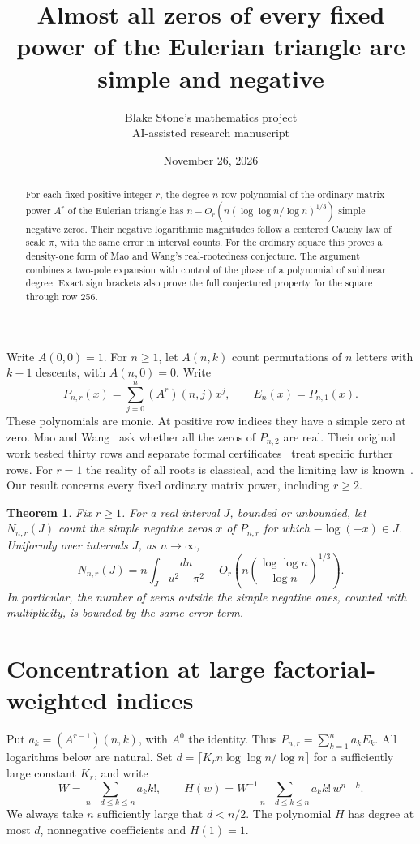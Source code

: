 \documentclass[11pt]{article}
\title{Almost all zeros of every fixed power of the Eulerian triangle are simple and negative}
\author{Blake Stone's mathematics project\\\small AI-assisted research manuscript}
\date{November 26, 2026}
\newtheorem{theorem}{Theorem}
\begin{document}
\maketitle
\begin{abstract}
For each fixed positive integer $r$, the degree-$n$ row polynomial of the ordinary matrix power $A^r$ of the Eulerian triangle has $n-O_r(n(\log\log n/\log n)^{1/3})$ simple negative zeros. Their negative logarithmic magnitudes follow a centered Cauchy law of scale $\pi$, with the same error in interval counts. For the ordinary square this proves a density-one form of Mao and Wang's real-rootedness conjecture. The argument combines a two-pole expansion with control of the phase of a polynomial of sublinear degree. Exact sign brackets also prove the full conjectured property for the square through row 256.
\end{abstract}

Write $A(0,0)=1$. For $n\ge1$, let $A(n,k)$ count permutations of $n$ letters with $k-1$ descents, with $A(n,0)=0$. Write
\[
 P_{n,r}(x)=\sum_{j=0}^n (A^r)(n,j)x^j,\qquad E_n(x)=P_{n,1}(x).
\]
These polynomials are monic. At positive row indices they have a simple zero at zero. Mao and Wang~\cite[Conj.~4.1]{MW} ask whether all the zeros of $P_{n,2}$ are real. Their original work tested thirty rows and separate formal certificates~\cite{TT} treat specific further rows. For $r=1$ the reality of all roots is classical, and the limiting law is known~\cite{Melotti}. Our result concerns every fixed ordinary matrix power, including $r\ge2$.

\begin{theorem}\label{main}
Fix $r\ge1$. For a real interval $J$, bounded or unbounded, let $N_{n,r}(J)$ count the simple negative zeros $x$ of $P_{n,r}$ for which $-\log(-x)\in J$. Uniformly over intervals $J$, as $n\to\infty$,
\[
 N_{n,r}(J)=n\int_J\frac{du}{u^2+\pi^2}
       +O_r\!\left(n\left(\frac{\log\log n}{\log n}\right)^{1/3}\right).
\]
In particular, the number of zeros outside the simple negative ones, counted with multiplicity, is bounded by the same error term.
\end{theorem}

\section{Concentration at large factorial-weighted indices}
Put $a_k=(A^{r-1})(n,k)$, with $A^0$ the identity. Thus $P_{n,r}=\sum_{k=1}^n a_k E_k$. All logarithms below are natural. Set $d=\lceil K_r n\log\log n/\log n\rceil$ for a sufficiently large constant $K_r$, and write
\[
 W=\sum_{n-d\le k\le n}a_k k!,\qquad H(w)=W^{-1}\sum_{n-d\le k\le n}a_k k!\,w^{n-k} .
\]
We always take $n$ sufficiently large that $d<n/2$. The polynomial $H$ has degree at most $d$, nonnegative coefficients and $H(1)=1$.
\end{document}
